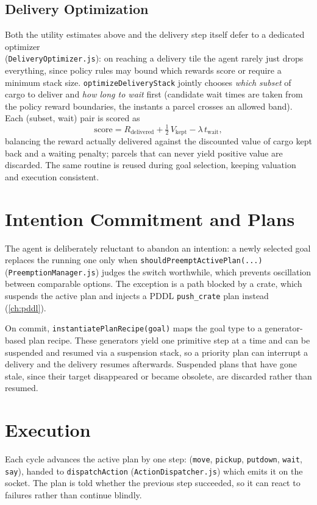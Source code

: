 \subsection{Delivery Optimization}
\label{sub:delivery-opt}
Both the utility estimates above and the delivery step itself defer to a dedicated
optimizer \\
(\texttt{DeliveryOptimizer.js}): on reaching a delivery tile the agent rarely
just drops everything, since policy rules may bound which rewards score or require a
minimum stack size. \texttt{optimizeDeliveryStack} jointly chooses \emph{which subset}
of cargo to deliver and \emph{how long to wait} first (candidate wait times are taken
from the policy reward boundaries, the instants a parcel crosses an allowed band).
Each (subset, wait) pair is scored as
%
\begin{equation}
  \mathrm{score} = R_{\text{delivered}} + \tfrac{1}{2}\,V_{\text{kept}}
                   - \lambda\, t_{\text{wait}},
\end{equation}
%
balancing the reward actually delivered against the discounted value of cargo kept back
and a waiting penalty; parcels that can never yield positive value are discarded. The
same routine is reused during goal selection, keeping valuation and execution consistent.

\section{Intention Commitment and Plans}
\label{sec:intention-plans}
The agent is deliberately reluctant to abandon an intention: a newly selected goal
replaces the running one only when \texttt{shouldPreemptActivePlan(...)}
(\texttt{PreemptionManager.js}) judges the switch worthwhile, which prevents
oscillation between comparable options. The exception is a path blocked by a crate,
which suspends the active plan and injects a PDDL \texttt{push\_crate} plan
instead (\cref{ch:pddl}).

On commit, \texttt{instantiatePlanRecipe(goal)} maps the goal type to a
generator-based plan recipe. These generators yield one primitive step at a time and can be suspended
and resumed via a suspension stack, so a priority plan can interrupt a
delivery and the delivery resumes afterwards. Suspended plans that have gone stale, since
their target disappeared or became obsolete, are discarded rather than resumed.

\section{Execution}
\label{sec:exec}
Each cycle advances the active plan by one step: (\texttt{move},
\texttt{pickup}, \texttt{putdown}, \texttt{wait}, \texttt{say}), handed to
\texttt{dispatchAction} (\texttt{ActionDispatcher.js}) which emits it on the socket.
The plan is told whether the previous step succeeded, so it can react to failures
rather than continue blindly.

